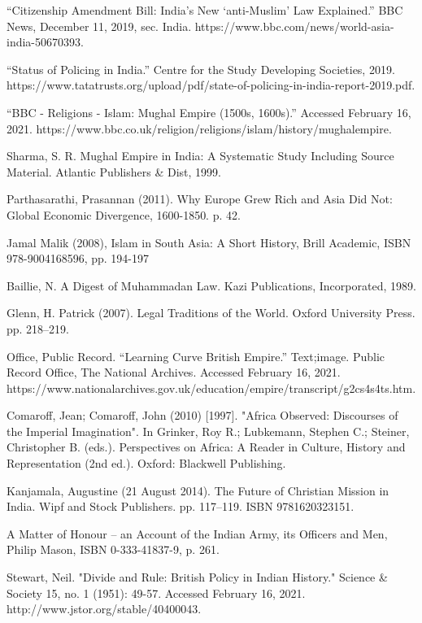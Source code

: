 \documentclass[11pt, letterpaper]{article}
\begin{document}
\begin{thebibliography}{100}
 “Citizenship Amendment Bill: India’s New ‘anti-Muslim’ Law Explained.” BBC News, December 11, 2019, sec. India. https://www.bbc.com/news/world-asia-india-50670393.

 “Status of Policing in India.” Centre for the Study Developing Societies, 2019. https://www.tatatrusts.org/upload/pdf/state-of-policing-in-india-report-2019.pdf.

 “BBC - Religions - Islam: Mughal Empire (1500s, 1600s).” Accessed February 16, 2021. https://www.bbc.co.uk/religion/religions/islam/history/mughalempire.

 Sharma, S. R. Mughal Empire in India: A Systematic Study Including Source Material. Atlantic Publishers & Dist, 1999.

 Parthasarathi, Prasannan (2011). Why Europe Grew Rich and Asia Did Not: Global Economic Divergence, 1600-1850. p. 42.

 Jamal Malik (2008), Islam in South Asia: A Short History, Brill Academic, ISBN 978-9004168596, pp. 194-197

 Baillie, N. A Digest of Muhammadan Law. Kazi Publications, Incorporated, 1989.

  Glenn, H. Patrick (2007). Legal Traditions of the World. Oxford University Press. pp. 218–219.

 Office, Public Record. “Learning Curve British Empire.” Text;image. Public Record Office, The National Archives. Accessed February 16, 2021. https://www.nationalarchives.gov.uk/education/empire/transcript/g2cs4s4ts.htm.

 Comaroff, Jean; Comaroff, John (2010) [1997]. "Africa Observed: Discourses of the Imperial Imagination". In Grinker, Roy R.; Lubkemann, Stephen C.; Steiner, Christopher B. (eds.). Perspectives on Africa: A Reader in Culture, History and Representation (2nd ed.). Oxford: Blackwell Publishing.

 Kanjamala, Augustine (21 August 2014). The Future of Christian Mission in India. Wipf and Stock Publishers. pp. 117–119. ISBN 9781620323151.

 A Matter of Honour – an Account of the Indian Army, its Officers and Men, Philip Mason, ISBN 0-333-41837-9, p. 261.

 Stewart, Neil. "Divide and Rule: British Policy in Indian History." Science & Society 15, no. 1 (1951): 49-57. Accessed February 16, 2021. http://www.jstor.org/stable/40400043.


\end{thebibliography}
\end{document}
